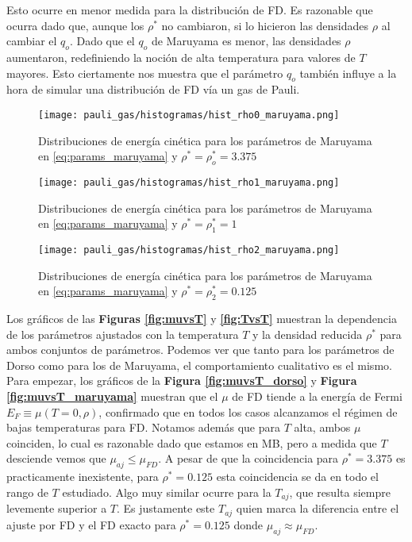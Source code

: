 Esto ocurre en menor medida para la distribución de FD.
Es razonable que ocurra dado que, aunque los $\rho^*$ no cambiaron, si lo hicieron las densidades $\rho$ al cambiar el $q_o$.
Dado que el $q_o$ de Maruyama es menor, las densidades $\rho$ aumentaron, redefiniendo la noción de alta temperatura para valores de $T$ mayores.
Esto ciertamente nos muestra que el parámetro $q_o$ también influye a la hora de simular una distribución de FD vía un gas de Pauli.
\begin{figure}[H]
	\centering
	\texttt{[image: pauli\_gas/histogramas/hist\_rho0\_maruyama.png]}
	\caption{Distribuciones de energía cinética para los parámetros de Maruyama en \eqref{eq:params_maruyama} y $\rho^* = \rho_o^* = 3.375$}
	\label{fig:hist_rho0_maruyama}
\end{figure}
\begin{figure}[H]
	\centering
	\texttt{[image: pauli\_gas/histogramas/hist\_rho1\_maruyama.png]}
	\caption{Distribuciones de energía cinética para los parámetros de Maruyama en \eqref{eq:params_maruyama} y $\rho^* = \rho_1^* = 1$}
	\label{fig:hist_rho1_maruyama}
\end{figure}
\begin{figure}[H]
	\centering
	\texttt{[image: pauli\_gas/histogramas/hist\_rho2\_maruyama.png]}
	\caption{Distribuciones de energía cinética para los parámetros de Maruyama en \eqref{eq:params_maruyama} y $\rho^* = \rho_2^* = 0.125$}
	\label{fig:hist_rho2_maruyama}
\end{figure}

Los gráficos de las \textbf{Figuras \ref{fig:muvsT}} y \textbf{\ref{fig:TvsT}} muestran la dependencia de los parámetros ajustados con la temperatura
$T$ y la densidad reducida $\rho^*$ para ambos conjuntos de parámetros.
Podemos ver que tanto para los parámetros de Dorso como para los de Maruyama, el comportamiento cualitativo es el mismo.
Para empezar, los gráficos de la \textbf{Figura \ref{fig:muvsT_dorso}} y \textbf{Figura \ref{fig:muvsT_maruyama}} muestran que el $\mu$ de FD tiende a la energía de Fermi $E_F\equiv \mu(T=0,\rho)$,
confirmado que en todos los casos alcanzamos el régimen de bajas temperaturas para FD.
Notamos además que para $T$ alta, ambos $\mu$ coinciden, lo cual es razonable dado que estamos en MB, pero a medida que $T$ desciende vemos que $\mu_{aj}\leq\mu_{FD}$.
A pesar de que la coincidencia para $\rho^*=3.375$ es practicamente inexistente, para $\rho^*=0.125$ esta coincidencia se da en todo el rango de $T$ estudiado.
Algo muy similar ocurre para la $T_{aj}$, que resulta siempre levemente superior a $T$.
Es justamente este $T_{aj}$ quien marca la diferencia entre el ajuste por FD y el FD exacto para $\rho^*=0.125$ donde $\mu_{aj}\approx\mu_{FD}$.


